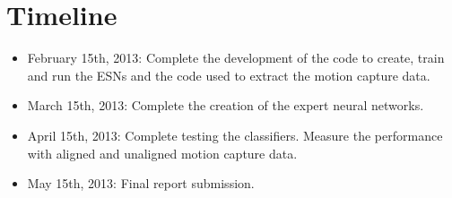 \documentclass[10pt]{article}
\begin{document}
\section{Timeline}
\begin{itemize}
  \item February 15th, 2013: Complete the development of the code to create, train and run the ESNs and the code used to extract the motion capture data.
  \item March 15th, 2013: Complete the creation of the expert neural networks. 
  \item April 15th, 2013: Complete testing the classifiers. Measure the performance with aligned and unaligned motion capture data.
  \item May 15th, 2013: Final report submission.
\end{itemize}



\end{document}
